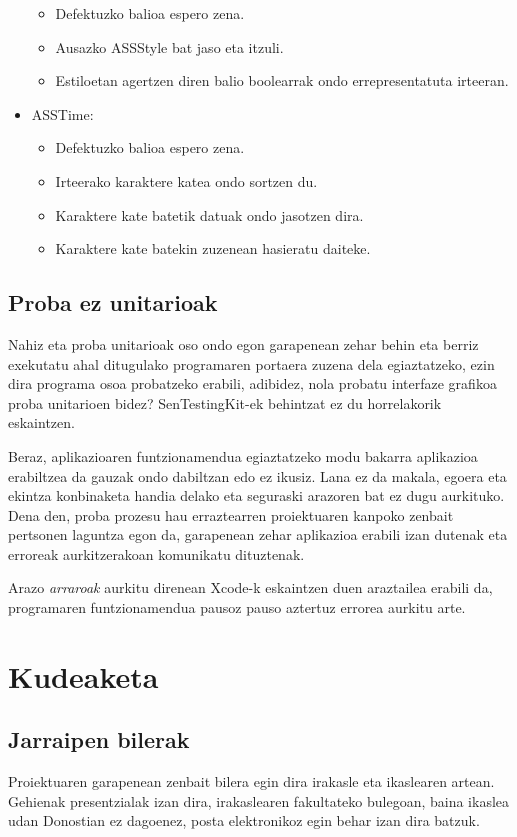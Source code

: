 \begin{itemize}
\begin{itemize}
		\item Defektuzko balioa espero zena.
		\item Ausazko ASSStyle bat jaso eta itzuli.
		\item Estiloetan agertzen diren balio boolearrak ondo errepresentatuta irteeran. 
	\end{itemize}
	\item ASSTime: \begin{itemize}
		\item Defektuzko balioa espero zena.
		\item Irteerako karaktere katea ondo sortzen du.
		\item Karaktere kate batetik datuak ondo jasotzen dira.
		\item Karaktere kate batekin zuzenean hasieratu daiteke.
	\end{itemize}
\end{itemize}

\subsection{Proba ez unitarioak}
Nahiz eta proba unitarioak oso ondo egon garapenean zehar behin eta berriz exekutatu ahal ditugulako programaren portaera zuzena dela egiaztatzeko, ezin dira programa osoa probatzeko erabili, adibidez, nola probatu interfaze grafikoa proba unitarioen bidez? SenTestingKit-ek behintzat ez du horrelakorik eskaintzen.

Beraz, aplikazioaren funtzionamendua egiaztatzeko modu bakarra aplikazioa erabiltzea da gauzak ondo dabiltzan edo ez ikusiz. Lana ez da makala, egoera eta ekintza konbinaketa handia delako eta seguraski arazoren bat ez dugu aurkituko. Dena den, proba prozesu hau erraztearren proiektuaren kanpoko zenbait pertsonen laguntza egon da, garapenean zehar aplikazioa erabili izan dutenak eta erroreak aurkitzerakoan komunikatu dituztenak.

Arazo \textit{arraroak} aurkitu direnean Xcode-k eskaintzen duen araztailea erabili da, programaren funtzionamendua pausoz pauso aztertuz errorea aurkitu arte.

\section{Kudeaketa}

\subsection{Jarraipen bilerak}
Proiektuaren garapenean zenbait bilera egin dira irakasle eta ikaslearen artean. Gehienak presentzialak izan dira, irakaslearen fakultateko bulegoan, baina ikaslea udan Donostian ez dagoenez, posta elektronikoz egin behar izan dira batzuk.

